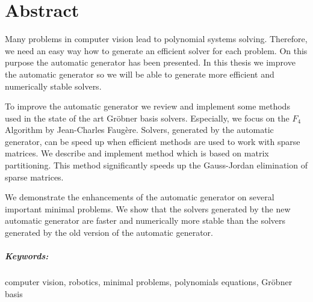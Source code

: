 \chapter*{Abstract}
Many problems in computer vision lead to polynomial systems solving. Therefore, we need an easy way how to generate an efficient solver for each problem. On this purpose the automatic generator has been presented. In this thesis we improve the automatic generator so we will be able to generate more efficient and numerically stable solvers.

To improve the automatic generator we review and implement some methods used in the state of the art Gr\"obner basis solvers. Especially, we focus on the $F_4$ Algorithm by Jean-Charles Faug\`ere. Solvers, generated by the automatic generator, can be speed up when efficient methods are used to work with sparse matrices. We describe and implement method which is based on matrix partitioning. This method significantly speeds up the Gauss-Jordan elimination of sparse matrices.

We demonstrate the enhancements of the automatic generator on several important minimal problems. We show that the solvers generated by the new automatic generator are faster and numerically more stable than the solvers generated by the old version of the automatic generator.

\paragraph{Keywords:} computer vision, robotics, minimal problems, polynomials equations, Gr\"ob\-ner basis

